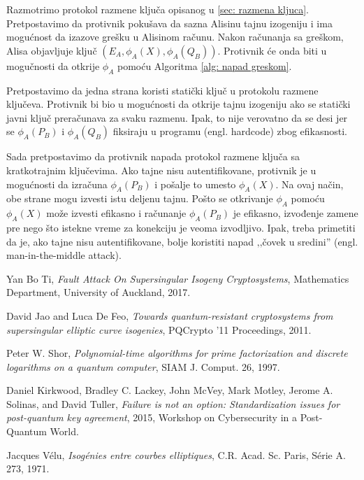 \documentclass[a4paper]{article}
\begin{document}
Razmotrimo protokol razmene ključa opisanog u \ref{sec: razmena kljuca}. Pretpostavimo da protivnik pokušava da sazna Alisinu tajnu izogeniju i ima mogućnost da izazove grešku u Alisinom računu. Nakon računanja sa greškom, Alisa objavljuje ključ $(E_A, \phi_A(X), \phi_A(Q_B))$. Protivnik će onda biti u mogučnosti da otkrije $\phi_A$ pomoću Algoritma \ref{alg: napad greskom}.


Pretpostavimo da jedna strana koristi statički ključ u protokolu razmene ključeva. Protivnik bi bio u mogućnosti da otkrije tajnu izogeniju ako se statički javni ključ preračunava za svaku razmenu. Ipak, to nije verovatno da se desi jer se $\phi_A(P_B)$ i $\phi_A(Q_B)$ fiksiraju u programu (engl. hardcode) zbog efikasnosti. 

Sada pretpostavimo da protivnik napada protokol razmene ključa sa kratkotrajnim ključevima. Ako tajne nisu autentifikovane, protivnik je u mogućnosti da izračuna $\phi_A(P_B)$ i pošalje to umesto $\phi_A(X)$. Na ovaj način, obe strane mogu izvesti istu deljenu tajnu. Pošto se otkrivanje $\phi_A$ pomoću  $\phi_A(X)$ može izvesti efikasno i računanje  $\phi_A(P_B)$ je efikasno, izvođenje zamene pre nego što istekne vreme za konekciju je veoma izvodljivo. Ipak, treba primetiti da je, ako tajne nisu autentifikovane, bolje koristiti napad ‚‚čovek u sredini'' (engl. man-in-the-middle attack).


\begin{thebibliography}{11}
	
	Yan Bo Ti,
	\textit{Fault Attack On Supersingular Isogeny Cryptosystems},
	Mathematics Department, University of Auckland,
	2017.
	
	David Jao and Luca De Feo, 
	\textit{Towards quantum-resistant cryptosystems from supersingular elliptic curve
	isogenies}, 
	PQCrypto '11 Proceedings, 
	2011.	
	
	Peter W. Shor, 
	\textit{Polynomial-time algorithms for prime factorization and discrete logarithms on a quantum
	computer}, 
	SIAM J. Comput. 26, 
	1997.
	
	Daniel Kirkwood, Bradley C. Lackey, John McVey, Mark Motley, Jerome A. Solinas, and David Tuller,
	\textit{Failure is not an option: Standardization issues for post-quantum key agreement}, 
	2015, 
	Workshop on Cybersecurity in a Post-Quantum World.
	
	
	Jacques V\' elu, 
	\textit{Isog\' enies entre courbes elliptiques}, 
	C.R. Acad. Sc. Paris, S\' erie A. 273,
	1971.
\end{thebibliography}
\end{document}
